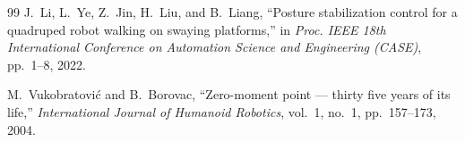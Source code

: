 \documentclass[13pt,a4paper,oneside]{extbook}
\begin{document}
\begin{thebibliography}{99}
J.~Li, L.~Ye, Z.~Jin, H.~Liu, and B.~Liang,
``Posture stabilization control for a quadruped robot walking on swaying platforms,''
in \textit{Proc. IEEE 18th International Conference on Automation Science and Engineering (CASE)}, pp.~1--8, 2022.

M.~Vukobratovi\'{c} and B.~Borovac,
``Zero-moment point --- thirty five years of its life,''
\textit{International Journal of Humanoid Robotics}, vol.~1, no.~1, pp.~157--173, 2004.

\end{thebibliography}


\end{document}
